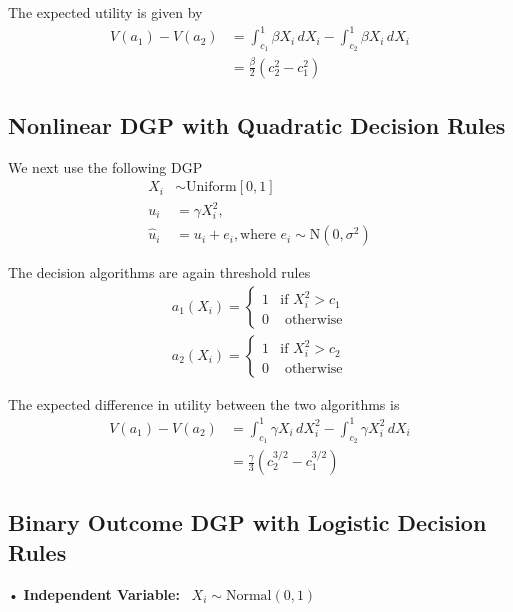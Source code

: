 \documentclass[
]{article}
\begin{document}
The expected utility is given by \[
\begin{aligned}
V(a_{1})- V(a_{2}) &= \int _{c_{1}}^1 \beta X_{i} \, dX_{i} - \int _{c_{2}}^1 \beta X_{i} \, dX_{i}  \\
&= \frac{\beta}{2}(c_{2}^2 - c_{1}^2)
\end{aligned}
\]

\subsection{Nonlinear DGP with Quadratic Decision
Rules}\label{nonlinear-dgp-with-quadratic-decision-rules}

We next use the following DGP \[
\begin{aligned}
X_{i} &\sim \text{Uniform}[0,1] \\
u_{i} &= \gamma X_{i}^2,  \\
\hat{u}_{i} &= u_{i} + e_{i}, \text{where } e_{i} \sim \text{N}(0, \sigma^2)
\end{aligned}
\]

The decision algorithms are again threshold rules \[
\begin{aligned}
a_{1}(X_{i})= \begin{cases} 
1  & \text{if } X^2_{i} > c_{1} \\
0  & \text{ otherwise}
\end{cases} \\
a_{2}(X_{i})= \begin{cases} 
1  & \text{if } X^2_{i} > c_{2} \\
0  & \text{ otherwise}
\end{cases}
\end{aligned}
\]

The expected difference in utility between the two algorithms is \[
\begin{aligned}
V(a_{1})- V(a_{2}) &= \int _{c_{1}}^1 \gamma X_{i} \, dX^2_{i} - \int _{c_{2}}^1 \gamma X^2_{i} \, dX_{i}  \\
&= \frac{\gamma}{3}(c_{2}^{3/2} - c_{1}^{3/2})
\end{aligned}
\]

\subsection{Binary Outcome DGP with Logistic Decision
Rules}\label{binary-outcome-dgp-with-logistic-decision-rules}

• \textbf{Independent Variable:}~ \(X_i \sim \text{Normal}(0, 1)\)
\end{document}
